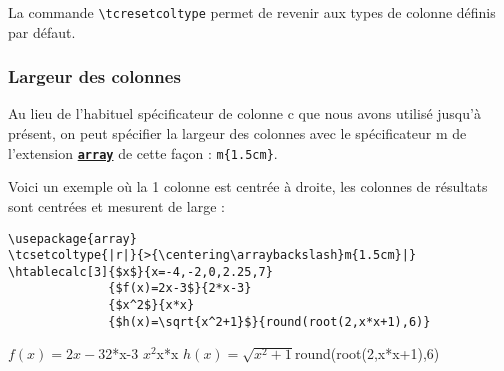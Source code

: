 \documentclass[a4paper,10pt]{article}
\newcommand\guill[1]{\og{}#1\fg{}}
\newcommand\verbinline{\lstinline[breaklines=false,basicstyle=\normalsize\ttfamily]}
\newcommand\mywidth{0.85\linewidth}
\begin{document}
La commande \verbinline|\tcresetcoltype| permet de revenir aux types de colonne définis par défaut.

\subsubsection{Largeur des colonnes}
Au lieu de l'habituel spécificateur de colonne \guill{c} que nous avons utilisé jusqu'à présent, on peut spécifier la largeur des colonnes avec le spécificateur \guill{m} de l'extension \href{http://www.ctan.org/tex-archive/graphics/pgf/base/latex/pgf/basiclayer/}{\texttt{\textbf{array}}} de cette façon : \og\verb|m{1.5cm}|\fg{}.\medskip

Voici un exemple où la 1\iere{} colonne est centrée à droite, les colonnes de résultats sont centrées et mesurent  de large :
\begin{center}
\begin{minipage}{\mywidth}
\begin{lstlisting}
\usepackage{array}
\tcsetcoltype{|r|}{>{\centering\arraybackslash}m{1.5cm}|}
\htablecalc[3]{$x$}{x=-4,-2,0,2.25,7}
              {$f(x)=2x-3$}{2*x-3}
              {$x^2$}{x*x}
              {$h(x)=\sqrt{x^2+1}$}{round(root(2,x*x+1),6)}
\end{lstlisting}
\end{minipage}

              {$f(x)=2x-3$}{2*x-3}
              {$x^2$}{x*x}
              {$h(x)=\sqrt{x^2+1}$}{round(root(2,x*x+1),6)}
\end{center}
\end{document}
